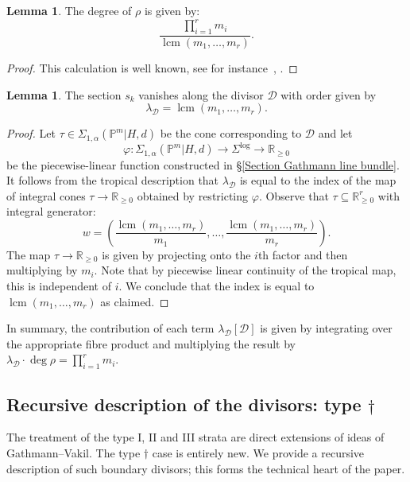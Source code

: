 \documentclass[11pt]{amsart}
\newcommand{\lcm}{\operatorname{lcm}}
\newcommand{\PP}{\mathbb P}
\renewcommand{\to}{\rightarrow}
\newcommand{\Dcal}{\mathcal{D}}
\newcommand{\RR}{\mathbb{R}}
\theoremstyle{definition}
\newtheorem{lemma}[thm]{Lemma}
\theoremstyle{definition}
\begin{document}
\begin{lemma}\label{lem:saturation} The degree of $\rho$ is given by:
\begin{equation*} \label{degree of gluing} \dfrac{\prod_{i=1}^r m_i}{\lcm(m_1,\ldots,m_r)}. \end{equation*}\end{lemma}
\begin{proof} This calculation is well known, see for instance~\cite[Section~7.9]{ChenDegeneration}, \cite[Section~5.3]{ACGSDecomposition}.
\end{proof}

\begin{lemma}\label{lemma vanishing order} The section $s_k$ vanishes along the divisor $\Dcal$ with order given by 
\[
\lambda_\Dcal = \lcm(m_1,\ldots,m_r).
\] 
\end{lemma}
\begin{proof} Let $\tau \in \Sigma_{1,\alpha}(\PP^m|H,d)$ be the cone corresponding to $\Dcal$ and let
\begin{equation*} \varphi \colon \Sigma_{1,\alpha}(\PP^m|H,d) \to \Sigma^{\log} \to \RR_{\geq 0} \end{equation*}
be the piecewise-linear function constructed in \S \ref{Section Gathmann line bundle}. It follows from the tropical description that $\lambda_\Dcal$ is equal to the index of the map of integral cones $\tau \to \RR_{\geq 0}$ obtained by restricting $\varphi$. Observe that $\tau \subseteq \RR_{\geq 0}^r$ with integral generator:
\begin{equation*} w = \left( \dfrac{\lcm(m_1,\ldots,m_r)}{m_1},\ldots,\dfrac{\lcm(m_1,\ldots,m_r)}{m_r} \right).\end{equation*}
The map $\tau \to \RR_{\geq 0}$ is given by projecting onto the $i$th factor and then multiplying by $m_i$. Note that by piecewise linear continuity of the tropical map, this is independent of $i$. We conclude that the index is equal to $\lcm(m_1,\ldots,m_r)$ as claimed.\end{proof}

In summary, the contribution of each term $\lambda_\Dcal [\Dcal]$ is given by integrating over the appropriate fibre product and multiplying the result by $\lambda_\Dcal \cdot \deg\rho = \prod_{i=1}^r m_i$.

\subsection{Recursive description of the divisors: type $\dag$}\label{subsection C0 splitting} The treatment of the type I, II and III strata are direct extensions of ideas of  Gathmann--Vakil. The type $\dag$ case is entirely new. We provide a recursive description of such boundary divisors; this forms the technical heart of the paper.
\end{document}
